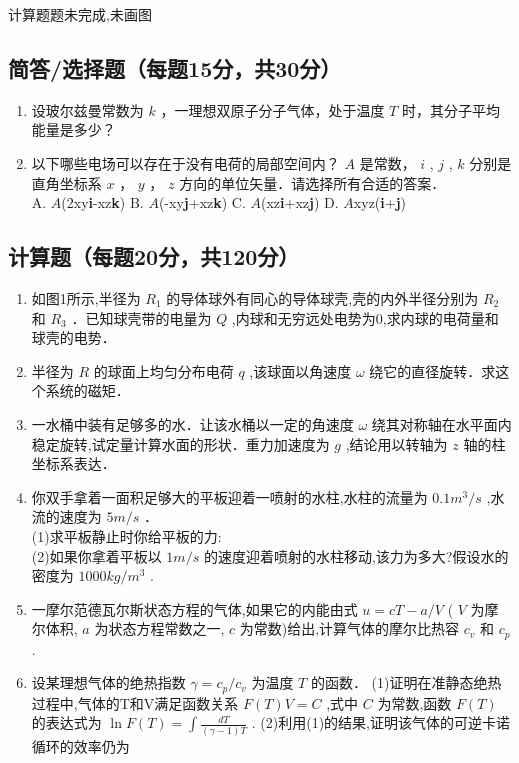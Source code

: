 
\begin{issues}
\issueTODO
计算题题未完成,未画图
\end{issues}


\subsection{简答/选择题（每题15分，共30分）}
\begin{enumerate}
\item 设玻尔兹曼常数为 $k$ ，一理想双原子分子气体，处于温度 $T$ 时，其分子平均能量是多少？
\item 以下哪些电场可以存在于没有电荷的局部空间内？ $A$ 是常数， $i$ , $j$ , $k$ 分别是直角坐标系 $x$ ， $y$ ， $z$ 方向的单位矢量．请选择所有合适的答案．\\
A. $A$(2xy\textbf{i}-xz\textbf{k}) B. $A$(-xy\textbf{j}+xz\textbf{k}) C. $A$(xz\textbf{i}+xz\textbf{j}) D. $A$xyz(\textbf{i}+\textbf{j})
\end{enumerate}
\subsection{计算题（每题20分，共120分）}
\begin{enumerate}
\item 如图1所示,半径为 $R_1$ 的导体球外有同心的导体球壳,壳的内外半径分别为 $R_2$ 和 $R_3$ ．已知球壳带的电量为 $Q$ ,内球和无穷远处电势为0,求内球的电荷量和球壳的电势．
\item 半径为 $R$ 的球面上均匀分布电荷 $q$ ,该球面以角速度 $\omega$ 绕它的直径旋转．求这个系统的磁矩．
\item 一水桶中装有足够多的水．让该水桶以一定的角速度 $\omega$ 绕其对称轴在水平面内稳定旋转,试定量计算水面的形状．重力加速度为 $g$ ,结论用以转轴为 $z$ 轴的柱坐标系表达．
\item 你双手拿着一面积足够大的平板迎着一喷射的水柱,水柱的流量为 $0.1m^{3}/s$ ,水流的速度为 $5m/s$ ．\\
(1)求平板静止时你给平板的力:\\
(2)如果你拿着平板以 $1m/s$ 的速度迎着喷射的水柱移动,该力为多大?假设水的密度为 $1000kg/m^{3}$ .
\item 一摩尔范德瓦尔斯状态方程的气体,如果它的内能由式 $u=cT-a/V$ ( $V$ 为摩尔体积, $a$ 为状态方程常数之一, $c$ 为常数)给出,计算气体的摩尔比热容 $c_v$ 和 $c_p$ .
\item 设某理想气体的绝热指数 $\gamma =c_p/c_v$ 为温度 $T$ 的函数．
(1)证明在准静态绝热过程中,气体的T和V满足函数关系 $F(T)V=C$ ,式中 $C$ 为常数,函数 $F(T)$ 的表达式为 $\ln F(T)=
\int \frac{dT}{(\gamma-1)T}$ .
(2)利用(1)的结果,证明该气体的可逆卡诺循环的效率仍为
\end{enumerate}